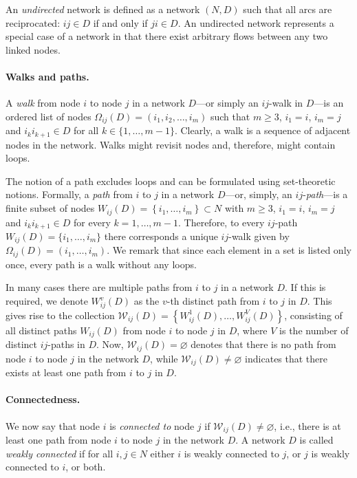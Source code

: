\documentclass[11pt,fleqn]{article}
\begin{document}
An \emph{undirected} network is defined as a network $(N,D)$ such that all arcs are reciprocated: $ij \in D$ if and only if $ji \in D$. An undirected network represents a special case of a network in that there exist arbitrary flows between any two linked nodes.

\paragraph{Walks and paths.}

A \emph{walk} from node $i$ to node $j$ in a network $D$---or simply an $ij$-walk in $D$---is an ordered list of nodes $\Omega_{ij} (D) = \left( i_1, i_2 , \ldots ,i_m \right)$ such that $m \geqslant 3$, $i_1 =i$, $i_m =j$ and $i_k i_{k+1} \in D$ for all $k \in \{ 1, \ldots ,m-1 \}$. Clearly, a walk is a sequence of adjacent nodes in the network. Walks might revisit nodes and, therefore, might contain loops.

The notion of a path excludes loops and can be formulated using set-theoretic notions. Formally, a \textit{path} from $i$ to $j$ in a network $D$---or, simply, an $ij$-\emph{path}---is a finite subset of nodes $W_{ij} (D) = \left\{ i_{1}, \ldots ,i_{m} \right\} \subset N$ with $m \geqslant 3$, $i_1 =i$, $i_m =j$ and $i_{k}i_{k+1} \in D$ for every $k=1, \ldots ,m-1$. Therefore, to every $ij$-path $W_{ij} (D) = \{ i_1, \ldots ,i_m \}$ there corresponds a unique $ij$-walk given by $\Omega_{ij} (D) = ( i_1, \ldots ,i_m )$. We remark that since each element in a set is listed only once, every path is a walk without any loops.

In many cases there are multiple paths from $i$ to $j$ in a network $D$. If this is required, we denote $W_{ij}^{v}(D)$ as the $v$-th distinct path from $i$ to $j$ in $D$. This gives rise to the collection $\mathcal{W}_{ij}(D)= \left\{ W_{ij}^{1}(D), \ldots ,W_{ij}^{V}(D) \right\}$, consisting of all distinct paths $W_{ij} (D)$ from node $i$ to node $j$ in $D$, where $V$ is the number of distinct $ij$-paths in $D$. Now, $\mathcal{W}_{ij}(D)= \varnothing$ denotes that there is no path from node $i$ to node $j$ in the network $D$, while $\mathcal{W}_{ij}(D) \neq \varnothing$ indicates that there exists at least one path from $i$ to $j$ in $D$.

\paragraph{Connectedness.}

We now say that node $i$ is \textit{connected to} node $j$ if $\mathcal{W}_{ij}(D) \neq \varnothing$, i.e., there is at least one path from node $i$ to node $j$ in the network $D$. A network $D$ is called \emph{weakly connected} if for all $i,j \in N$ either $i$ is weakly connected to $j$, or $j$ is weakly connected to $i$, or both.
\end{document}
